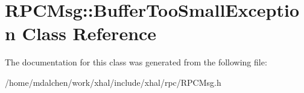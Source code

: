 \hypertarget{classRPCMsg_1_1BufferTooSmallException}{
\section{RPCMsg::BufferTooSmallException Class Reference}
\label{classRPCMsg_1_1BufferTooSmallException}
}


The documentation for this class was generated from the following file:\begin{DoxyCompactItemize}
\item 
/home/mdalchen/work/xhal/include/xhal/rpc/RPCMsg.h\end{DoxyCompactItemize}
